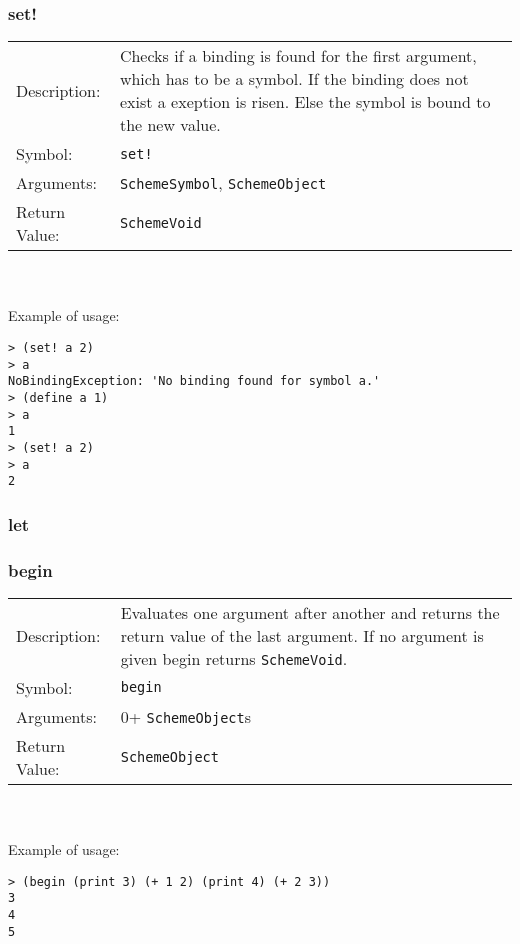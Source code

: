 \documentclass[12pt,a4paper]{scrartcl}
\begin{document}
\subsubsection*{set!}
\begin{tabular}{l  p{13cm}}
Description: & Checks if a binding is found for the first argument, which has to be a symbol. If the binding does not exist a exeption is risen. Else the symbol is bound to the new value. \\
Symbol: & \lstinline{set!}\\
Arguments: & \lstinline{SchemeSymbol}, \lstinline{SchemeObject} \\
Return Value: & \lstinline{SchemeVoid}\\
\end{tabular}
\\
\\
Example of usage:
\begin{lstlisting}
> (set! a 2)
> a
NoBindingException: 'No binding found for symbol a.'
> (define a 1)
> a
1
> (set! a 2)
> a
2
\end{lstlisting}

\subsubsection*{let}

\subsubsection*{begin}
\begin{tabular}{l  p{13cm}}
Description: & Evaluates one argument after another and returns the return value of the last argument. If no argument is given begin returns \lstinline{SchemeVoid}.\\
Symbol: & \lstinline{begin}\\
Arguments: & 0+ \lstinline{SchemeObject}s \\
Return Value: & \lstinline{SchemeObject} \\
\end{tabular}
\\
\\
Example of usage:
\begin{lstlisting}
> (begin (print 3) (+ 1 2) (print 4) (+ 2 3))
3
4
5
\end{lstlisting}
\end{document}
